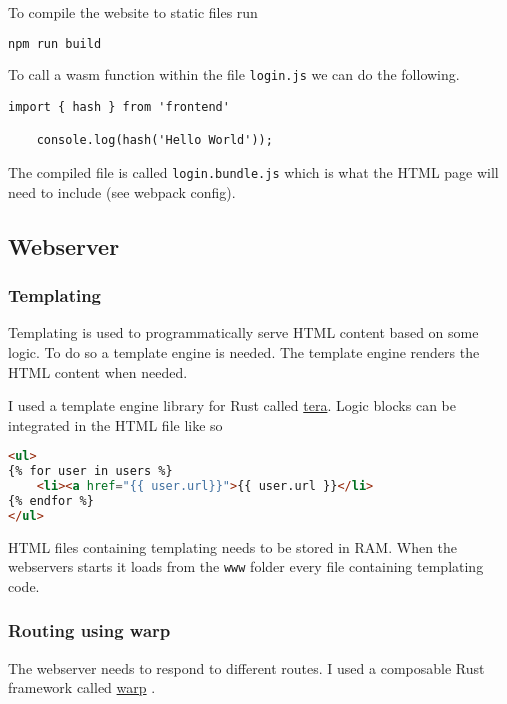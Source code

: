 \documentclass[../documentation.tex]{subfiles}
\begin{document}
To compile the website to static files run
\begin{lstlisting}[language=bash]
    npm run build
\end{lstlisting}

To call a wasm function within the file \texttt{login.js}
we can do the following.

\begin{lstlisting}[style=js]
    import { hash } from 'frontend'

    console.log(hash('Hello World'));
\end{lstlisting}

The compiled file is called \texttt{login.bundle.js}
which is what the HTML page will need to include (see webpack config).

\pagebreak

\subsection{Webserver}

\subsubsection{Templating}

Templating is used to programmatically serve HTML content based on some logic.
To do so a template engine is needed. The template engine renders the HTML content
when needed.

I used a template engine library for Rust called
\href{https://github.com/Keats/tera}{tera}.
Logic blocks can be integrated in the HTML file like so
\begin{lstlisting}[language=html]
<ul>
{% for user in users %}
    <li><a href="{{ user.url}}">{{ user.url }}</li>
{% endfor %}
</ul>
\end{lstlisting}

HTML files containing templating needs to be stored in RAM.
When the webservers starts it loads from the \texttt{www} folder
every file containing templating code.

\subsubsection{Routing using warp}

The webserver needs to respond to different routes.
I used a composable Rust framework called
\href{https://github.com/seanmonstar/warp}{warp} \cite{warp}.
\end{document}
